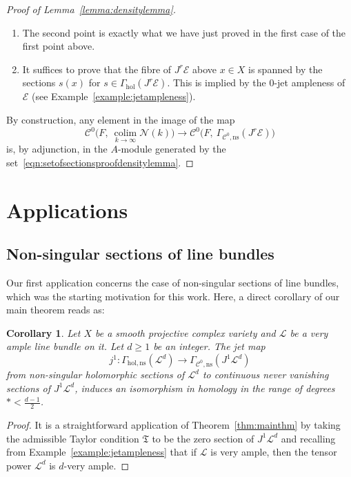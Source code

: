 \documentclass[a4paper]{amsart}
\newcommand{\cE}{\mathcal E}
\newcommand{\cC}{\mathcal C}
\newcommand{\cN}{\mathcal N}
\newcommand{\cL}{\mathcal L}
\newcommand{\fT}{\mathfrak T}
\newcommand{\lra}{\longrightarrow}
\DeclareMathOperator*{\colim}{colim}
\theoremstyle{plain}
\newtheorem{corollary}[theorem]{Corollary}
\theoremstyle{definition}
\newcommand{\Gammahol}{\Gamma_{\mathrm{hol}}}
\begin{document}
\begin{proof}[Proof of Lemma~\ref{lemma:densitylemma}]
\begin{enumerate}
    \item The second point is exactly what we have just proved in the first case of the first point above.
    \item It suffices to prove that the fibre of $J^r\cE$ above $x\in X$ is spanned by the sections $s(x)$ for $s \in \Gammahol(J^r\cE)$. This is implied by the $0$-jet ampleness of $\cE$ (see Example~\ref{example:jetampleness}).
\end{enumerate}
By construction, any element in the image of the map
\[
    \cC^0\big(F, \ \colim\limits_{k \to \infty} \cN(k)\big) \lra \cC^0\big(F, \ \Gamma_{\cC^0, \mathrm{ns}}\left(J^r\cE\right)  \big)
\]
is, by adjunction, in the $A$-module generated by the set~\eqref{eqn:setofsectionsproofdensitylemma}.
\end{proof}


\section{Applications}
\label{section:app}

\subsection{Non-singular sections of line bundles}

Our first application concerns the case of non-singular sections of line bundles, which was the starting motivation for this work. Here, a direct corollary of our main theorem reads as:

\begin{corollary}\label{cor:nonsingularsectionslinebundle}
Let $X$ be a smooth projective complex variety and $\cL$ be a very ample line bundle on it. Let $d \geq 1$ be an integer. The jet map
\[
    j^1 \colon \Gamma_{\mathrm{hol, ns}}\left( \cL^d \right) \lra \Gamma_{\cC^0, \mathrm{ns}}\left( J^1\cL^d \right)
\]
from non-singular holomorphic sections of $\cL^d$ to continuous never vanishing sections of $J^1\cL^d$, induces an isomorphism in homology in the range of degrees $* < \frac{d-1}{2}$.
\end{corollary}
\begin{proof}
It is a straightforward application of Theorem~\ref{thm:mainthm} by taking the admissible Taylor condition $\fT$ to be the zero section of $J^1\cL^d$ and recalling from Example~\ref{example:jetampleness} that if $\cL$ is very ample, then the tensor power $\cL^d$ is $d$-very ample.
\end{proof}
\end{document}
